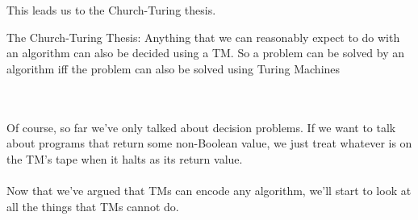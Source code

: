 \documentclass[12pt]{article}
\begin{document}
This leads us to the Church-Turing thesis.

\begin{tcolorbox}
 The Church-Turing Thesis: Anything that we can reasonably expect to do with an algorithm can also be decided using a TM. So a problem can be solved by an algorithm iff the problem can also be solved using Turing Machines
\end{tcolorbox}
\\
\\
Of course, so far we've only talked about decision problems. If we want to talk about programs that return some non-Boolean value, we just treat whatever is on the TM's tape when it halts as its return value.
\\
\\
Now that we've argued that TMs can encode any algorithm, we'll start to look at all the things that TMs cannot do.
\end{document}
